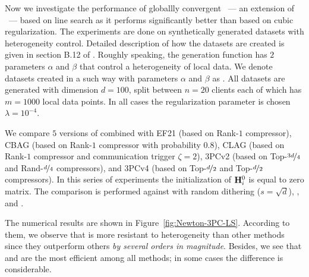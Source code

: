 \documentclass[11pt]{article}
\begin{document}
	
	Now we investigate the performance of globallly convergent ~--- an extension of ~--- based on line search as it performs significantly better than  based on cubic regularization. The experiments are done on synthetically generated datasets with heterogeneity control. Detailed description of how the datasets are created is given in  section B.12 of \citep{FedNL2021}. Roughly speaking, the generation function has $2$ parameters $\alpha$ and $\beta$ that control a heterogeneity of local data. We denote datasets created in a such way with parameters $\alpha$ and $\beta$ as . All datasets are generated with dimension $d=100$, split between $n=20$ clients each of which has $m=1000$ local data points. In all cases the regularization parameter is chosen $\lambda=10^{-4}$.
	
	We compare $5$ versions of  combined with EF21 (based on Rank-$1$ compressor), CBAG (based on Rank-$1$ compressor with probability $0.8$), CLAG (based on Rank-$1$ compressor and communication trigger $\zeta=2$), 3PCv2 (based on Top-$\nicefrac{3d}{4}$ and Rand-$\nicefrac{d}{4}$ compressors), and 3PCv4 (based on Top-$\nicefrac{d}{2}$ and Top-$\nicefrac{d}{2}$ compressors). In this series of experiments the initialization of $\mathbf{H}^0_i$ is equal to zero matrix. The comparison is performed against  \citep{ADIANA} with random dithering ($s=\sqrt{d}$),  \citep{IOSFabbro2022}, and  \citep{GIANT2018}. 
	
	The numerical results are shown in Figure~\ref{fig:Newton-3PC-LS}. According to them, we observe that  is more resistant to heterogeneity than other methods since they outperform others {\it by several orders in magnitude}. Besides, we see that  and  are the most efficient among all  methods; in some cases the difference is considerable.
	
\end{document}
